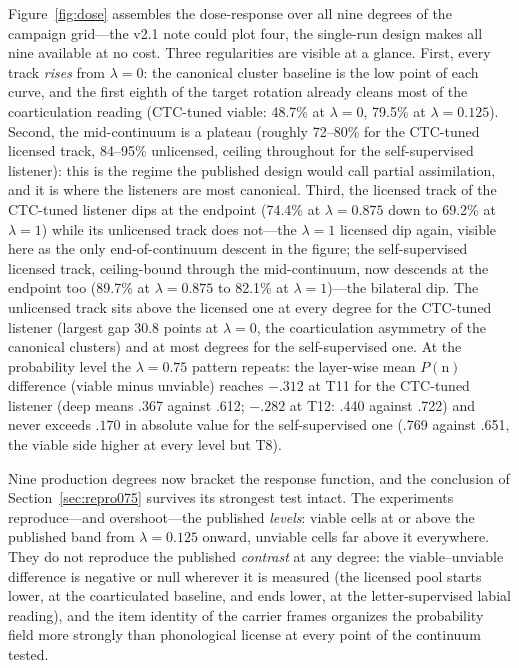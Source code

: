 \documentclass[11pt,a4paper]{article}
\newcommand{\lam}{\lambda}
\begin{document}
Figure~\ref{fig:dose} assembles the dose-response over all nine
degrees of the campaign grid---the v2.1 note could plot four, the
single-run design makes all nine available at no cost. Three
regularities are visible at a glance. First, every track \emph{rises}
from $\lam=0$: the canonical cluster baseline is the low point of
each curve, and the first eighth of the target rotation already
cleans most of the coarticulation reading (CTC-tuned viable: 48.7\%
at $\lam=0$, 79.5\% at $\lam=0.125$). Second, the mid-continuum is a
plateau (roughly 72--80\% for the CTC-tuned licensed track, 84--95\%
unlicensed, ceiling throughout for the self-supervised listener):
this is the regime the published design would call partial
assimilation, and it is where the listeners are most canonical.
Third, the licensed track of the CTC-tuned listener dips at the
endpoint (74.4\% at $\lam=0.875$ down to 69.2\% at $\lam=1$) while
its unlicensed track does not---the $\lam=1$ licensed dip again,
visible here as the only end-of-continuum descent in the figure; the
self-supervised licensed track, ceiling-bound through the
mid-continuum, now descends at the endpoint too (89.7\% at
$\lam=0.875$ to 82.1\% at $\lam=1$)---the bilateral dip.
The unlicensed track sits above the licensed one at every degree for
the CTC-tuned listener (largest gap 30.8 points at $\lam=0$, the
coarticulation asymmetry of the canonical clusters) and at most
degrees for the self-supervised one. At the probability level the
$\lam=0.75$ pattern repeats: the layer-wise mean
$P(\mathrm{n})$ difference (viable minus unviable) reaches $-.312$
at T11 for the CTC-tuned listener (deep means .367 against .612;
$-.282$ at T12: .440 against .722) and never exceeds $.170$ in
absolute value for the self-supervised one (.769 against .651,
the viable side higher at every level but T8).

Nine production degrees now bracket the response function, and the
conclusion of Section~\ref{sec:repro075} survives its strongest
test intact. The experiments reproduce---and overshoot---the
published \emph{levels}: viable cells at or above the published band
from $\lam=0.125$ onward, unviable cells far above it everywhere.
They do not reproduce the published \emph{contrast} at any degree:
the viable--unviable difference is negative or null wherever it is
measured (the licensed pool starts lower, at the coarticulated
baseline, and ends lower, at the letter-supervised labial reading),
and the item identity of the carrier frames organizes the
probability field more strongly than phonological license at every
point of the continuum tested.
\end{document}
